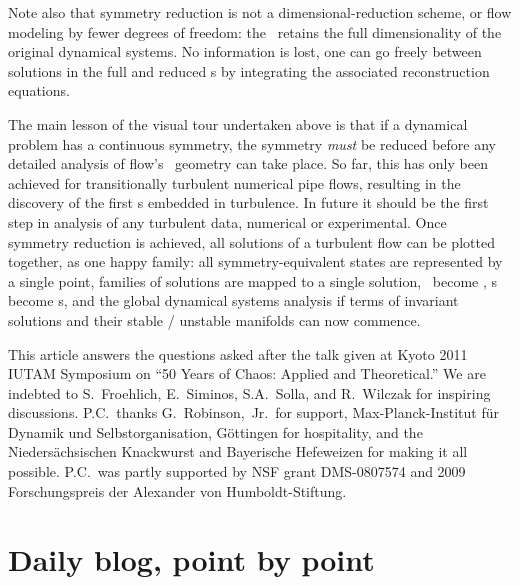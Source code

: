 \documentclass[aip,cha,reprint,
secnumarabic,
nofootinbib, tightenlines,
nobibnotes, showkeys, showpacs,
groupedaddress
]{revtex4-1}
\begin{document}
Note also that symmetry reduction is not a dimensional-reduction scheme,
or flow modeling by fewer degrees of freedom: the \reducedsp\ retains the
full dimensionality of the original dynamical systems. No information is
lost, one can go freely between solutions in the full and reduced
\statesp s by integrating the associated {reconstruction equations}.

The main lesson of the visual tour undertaken above is that if a
dynamical problem has a continuous symmetry, the symmetry \emph{must} be
reduced before any detailed analysis of flow's \statesp\ geometry can
take place. So far, this has only been achieved for transitionally
turbulent numerical pipe flows, resulting in the discovery of
the first \rpo s embedded in turbulence. In future it should be the first
step in analysis of any turbulent data, numerical or
experimental. Once symmetry reduction is achieved, all
solutions of a turbulent flow can be plotted together, as one happy
family: all symmetry-equivalent states are represented by a single point,
families of solutions are mapped to a single solution, \reqva\ become
\eqva, \rpo s become \po s, and the global dynamical systems analysis if
terms of invariant solutions and their stable / unstable manifolds can
now commence.

\begin{acknowledgments}
This article answers the questions asked after the talk given at
Kyoto 2011 IUTAM Symposium on ``50 Years of Chaos: Applied and Theoretical.''
We are indebted to
S.~Froehlich,
E.~Siminos,
S.A.~Solla,
and
R.~Wilczak
for inspiring discussions.
P.C.\ thanks G.~Robinson,~Jr.\ for support,
Max-Planck-Institut f\"ur Dynamik und Selbstorganisation,
G\"ottingen for hospitality,
and the Nieders\"achsischen Knackwurst and Bayerische Hefeweizen for
making it all possible.
P.C.\ was partly supported by NSF grant DMS-0807574
and
2009 Forschungspreis der Alexander von Humboldt-Stiftung.
\end{acknowledgments}


% 


\ifdraft
    \onecolumngrid

    \newpage

    \newpage

    \newpage
    \section{Daily blog, point by point}
    \label{chap:atlas}

\fi
\end{document}
